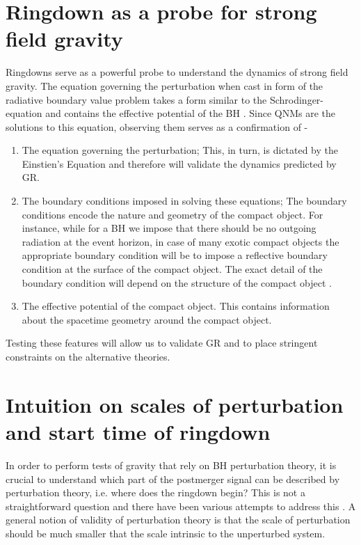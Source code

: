 \section{Ringdown as a probe for strong field gravity}
Ringdowns serve as a powerful probe to understand the dynamics of strong field gravity. The equation governing the perturbation when cast in form of the radiative boundary value problem \cite{PhysRevD.2.2141,1985RSPSA.402..285L,Teukolsky:2014vca} takes a form similar to the Schrodinger-equation and contains the effective potential of the BH \cite{ChandrasBookOnSchwarschildPert}. Since QNMs are the solutions to this equation, observing them serves as a confirmation of -

\begin{enumerate}
\item The equation governing the perturbation; This, in turn, is dictated by the Einstien's Equation and therefore will validate the dynamics predicted by GR.
\item The boundary conditions imposed in solving these equations; The boundary conditions encode the nature and geometry of the compact object. For instance, while for a BH we impose that there should be no outgoing radiation at the event horizon, in case of many exotic compact objects the appropriate boundary condition will be to impose a reflective boundary condition at the surface of the compact object. The exact detail of the boundary condition will depend on the structure of the compact object \cite{echo1,echo2}.
\item The effective potential of the compact object. This contains information about the spacetime geometry around the compact object.  
\end{enumerate}
Testing these features will allow us to validate GR and to place stringent constraints on the alternative theories. 

\section{Intuition on scales of perturbation and start time of ringdown}
In order to perform tests of gravity that rely on BH perturbation theory, it is crucial to understand which part of the postmerger signal can be described by perturbation theory, i.e. where does the ringdown begin? This is not a straightforward question and there have been various attempts to address this \cite{EMOP,Baibhav:2017jhs,London,2012PhRvL.109n1102K}. A general notion of validity of perturbation theory is that the scale of perturbation should be much smaller that the scale intrinsic to the unperturbed system. 

